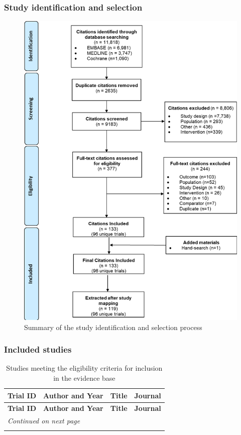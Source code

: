 \documentclass[11pt,final,fleqn]{article}
\theoremstyle{plain}
\begin{document}
\begin{appendices}
\subsubsection{Study identification and selection}
\begin{figure}[H]
\centering
\includegraphics{study-selection.png}
\vspace*{10mm}
\caption{Summary of the study identification and selection process}\label{fig:study-identification}
\end{figure}

\subsubsection{Included studies}


\begin{landscape}
\scriptsize
\begin{longtable}{p{2cm}p{2cm}p{10cm}p{4cm}}
\caption{Studies meeting the eligibility criteria for inclusion in the evidence base} 
\label{tbl:included studies} \\
\hline
\textbf{Trial ID}&\textbf{Author and Year}&\textbf{Title}&\textbf{Journal} \\
\hline
\endfirsthead
\hline
\textbf{Trial ID}&\textbf{Author and Year}&\textbf{Title}&\textbf{Journal} \\
\hline
\endhead
\hline 
\multicolumn{7}{l}{\emph{Continued on next page}} \\
\endfoot
\endlastfoot


\end{longtable}
\end{landscape}
\end{appendices}
\end{document}
